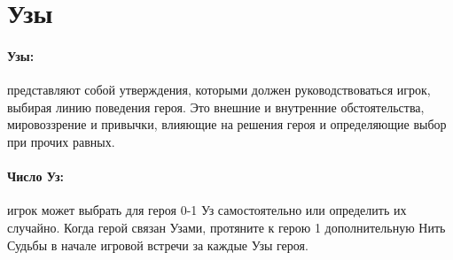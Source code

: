 \section{Узы}
\paragraph{Узы:} представляют собой утверждения, которыми должен руководствоваться игрок, выбирая линию поведения героя. Это внешние и внутренние обстоятельства, мировоззрение и привычки, влияющие на решения героя и определяющие выбор при прочих равных.
\paragraph{Число Уз:} игрок может выбрать для героя 0-1 Уз самостоятельно или определить их случайно. Когда герой связан Узами, протяните к герою 1 дополнительную Нить Судьбы в начале игровой встречи за каждые Узы героя.
